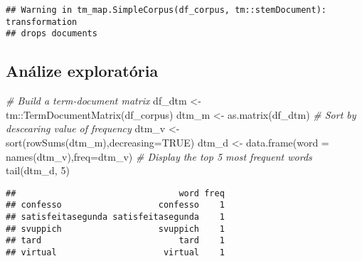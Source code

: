 \documentclass[
]{article}
\newenvironment{Shaded}{\begin{snugshade}}{\end{snugshade}}
\newcommand{\AttributeTok}[1]{\textcolor[rgb]{0.77,0.63,0.00}{#1}}
\newcommand{\CommentTok}[1]{\textcolor[rgb]{0.56,0.35,0.01}{\textit{#1}}}
\newcommand{\ConstantTok}[1]{\textcolor[rgb]{0.00,0.00,0.00}{#1}}
\newcommand{\DecValTok}[1]{\textcolor[rgb]{0.00,0.00,0.81}{#1}}
\newcommand{\FunctionTok}[1]{\textcolor[rgb]{0.00,0.00,0.00}{#1}}
\newcommand{\NormalTok}[1]{#1}
\newcommand{\OtherTok}[1]{\textcolor[rgb]{0.56,0.35,0.01}{#1}}
\newcommand{\SpecialCharTok}[1]{\textcolor[rgb]{0.00,0.00,0.00}{#1}}
\newcommand{\StringTok}[1]{\textcolor[rgb]{0.31,0.60,0.02}{#1}}
\begin{document}
\begin{verbatim}
## Warning in tm_map.SimpleCorpus(df_corpus, tm::stemDocument): transformation
## drops documents
\end{verbatim}

\hypertarget{anuxe1lize-exploratuxf3ria}{%
\subsection{Análize exploratória}\label{anuxe1lize-exploratuxf3ria}}

\begin{Shaded}
\begin{Highlighting}[]
\CommentTok{\# Build a term{-}document matrix}
\NormalTok{df\_dtm }\OtherTok{\textless{}{-}}\NormalTok{ tm}\SpecialCharTok{::}\FunctionTok{TermDocumentMatrix}\NormalTok{(df\_corpus)}
\NormalTok{dtm\_m }\OtherTok{\textless{}{-}} \FunctionTok{as.matrix}\NormalTok{(df\_dtm)}
\CommentTok{\# Sort by descearing value of frequency}
\NormalTok{dtm\_v }\OtherTok{\textless{}{-}} \FunctionTok{sort}\NormalTok{(}\FunctionTok{rowSums}\NormalTok{(dtm\_m),}\AttributeTok{decreasing=}\ConstantTok{TRUE}\NormalTok{)}
\NormalTok{dtm\_d }\OtherTok{\textless{}{-}} \FunctionTok{data.frame}\NormalTok{(}\AttributeTok{word =} \FunctionTok{names}\NormalTok{(dtm\_v),}\AttributeTok{freq=}\NormalTok{dtm\_v)}
\CommentTok{\# Display the top 5 most frequent words}
\FunctionTok{tail}\NormalTok{(dtm\_d, }\DecValTok{5}\NormalTok{)}
\end{Highlighting}
\end{Shaded}

\begin{verbatim}
##                                word freq
## confesso                   confesso    1
## satisfeitasegunda satisfeitasegunda    1
## svuppich                   svuppich    1
## tard                           tard    1
## virtual                     virtual    1
\end{verbatim}

\begin{Shaded}
\end{Shaded}
\end{document}
